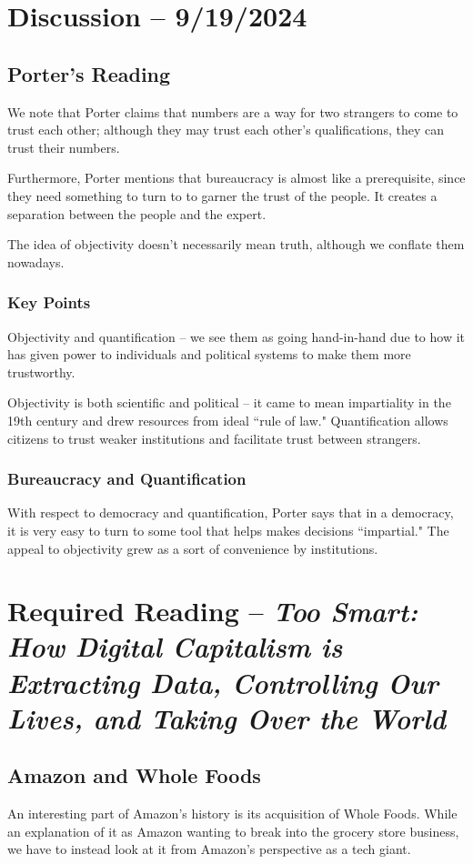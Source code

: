 \documentclass[openany]{book}
\begin{document}
\section{Discussion -- 9/19/2024}
\subsection{Porter's Reading}
We note that Porter claims that numbers are a way for two strangers to come to trust each other; although they may trust each other's qualifications, they can trust their numbers.

Furthermore, Porter mentions that bureaucracy is almost like a prerequisite, since they need something to turn to to garner the trust of the people. It creates a separation between the people and the expert.

The idea of objectivity doesn't necessarily mean truth, although we conflate them nowadays.

\subsubsection{Key Points}
Objectivity and quantification -- we see them as going hand-in-hand due to how it has given power to individuals and political systems to make them more trustworthy.

Objectivity is both scientific and political -- it came to mean impartiality in the 19th century and drew resources from ideal ``rule of law." Quantification allows citizens to trust weaker institutions and facilitate trust between strangers.

\subsubsection{Bureaucracy and Quantification}
With respect to democracy and quantification, Porter says that in a democracy, it is very easy to turn to some tool that helps makes decisions ``impartial." The appeal to objectivity grew as a sort of convenience by institutions.

\section{Required Reading -- \textit{Too Smart: How Digital Capitalism is Extracting Data, Controlling Our Lives, and Taking Over the World}}
\subsection{Amazon and Whole Foods}
An interesting part of Amazon's history is its acquisition of Whole Foods. While an explanation of it as Amazon wanting to break into the grocery store business, we have to instead look at it from Amazon's perspective as a tech giant.
\end{document}
